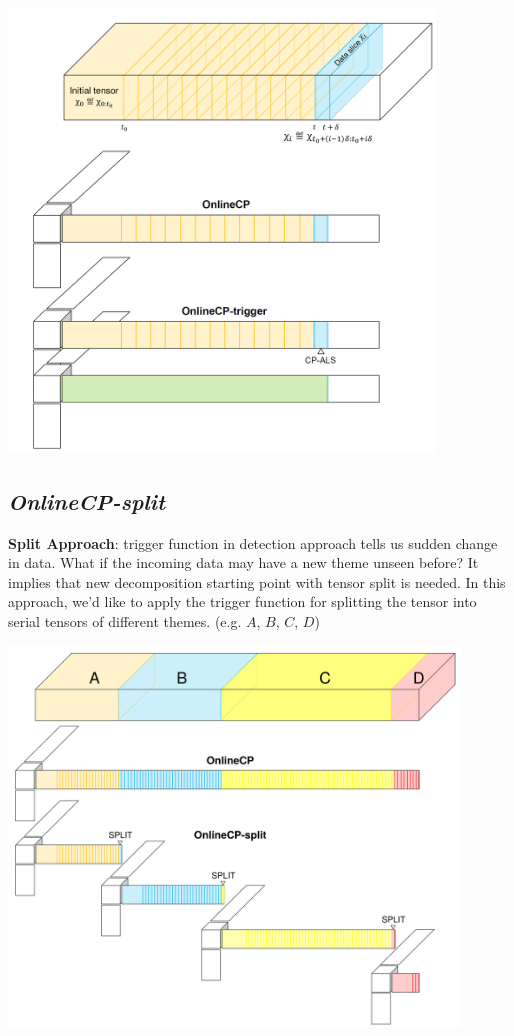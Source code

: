 \begin{center}
	\includegraphics[width=0.85\textwidth]{FIG/OnlineCP-trigger.png}
\end{center}

\newpage
\subsection{\em OnlineCP-split}
\textbf{Split Approach}: trigger function in detection approach tells us sudden change in data. What if the incoming data may have a new theme unseen before? It implies that new decomposition starting point with tensor split is needed. In this approach, we'd like to apply the trigger function for splitting the tensor into serial tensors of different themes. (e.g. $A$, $B$, $C$, $D$)

\begin{center}
	\includegraphics[width=0.9\textwidth]{FIG/OnlineCP-split.png}
\end{center}

